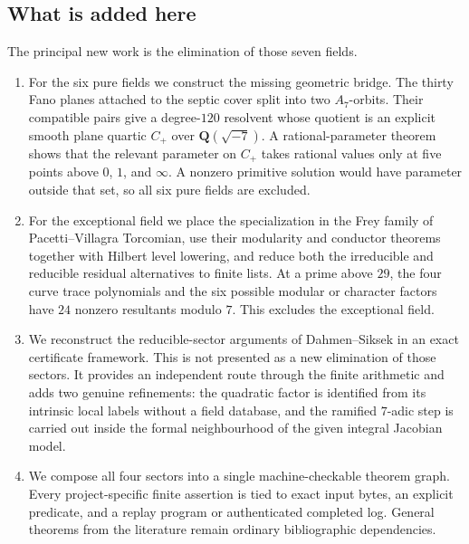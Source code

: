 \documentclass[11pt]{article}
\newcommand{\Q}{\mathbf Q}
\theoremstyle{definition}
\theoremstyle{remark}
\begin{document}
\subsection{What is added here}

The principal new work is the elimination of those seven fields.

\begin{enumerate}[label=\textnormal{(\roman*)},leftmargin=2.2em]
\item For the six pure fields we construct the missing geometric bridge.
The thirty Fano planes attached to the septic cover split into two
$A_7$-orbits.  Their compatible pairs give a degree-$120$ resolvent whose
quotient is an explicit smooth plane quartic $C_+$ over
$\Q(\sqrt{-7})$.  A rational-parameter theorem shows that the relevant
parameter on $C_+$ takes rational values only at five points above
$0$, $1$, and $\infty$.  A nonzero primitive solution would have parameter
outside that set, so all six pure fields are excluded.

\item For the exceptional field we place the specialization in the Frey
family of Pacetti--Villagra Torcomian, use their modularity and conductor
theorems together with Hilbert level lowering, and reduce both the
irreducible and reducible residual alternatives to finite lists.  At a prime
above $29$, the four curve trace polynomials and the six possible modular or
character factors have $24$ nonzero resultants modulo $7$.  This excludes the
exceptional field.

\item We reconstruct the reducible-sector arguments of Dahmen--Siksek in an exact
certificate framework.  This is not presented as a new elimination of those
sectors.  It provides an independent route through the finite arithmetic and
adds two genuine refinements: the quadratic factor is identified from its
intrinsic local labels without a field database, and the ramified $7$-adic
step is carried out inside the formal neighbourhood of the given integral
Jacobian model.

\item We compose all four sectors into a single machine-checkable theorem
graph.  Every project-specific finite assertion is tied to exact input bytes,
an explicit predicate, and a replay program or authenticated completed log.
General theorems from the literature remain ordinary bibliographic dependencies.
\end{enumerate}
\end{document}
